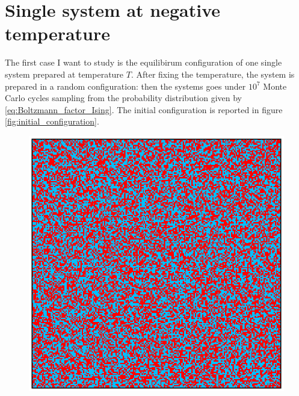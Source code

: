 \section{Single system at negative temperature}
The first case I want to study is the equilibirum configuration of one single system prepared at temperature $T$. After fixing the temperature, the system is prepared in a random configuration: then the systems goes under $10^7$ Monte Carlo cycles 
sampling from the probability distribution given by \ref{eq:Boltzmann_factor_Ising}. The initial configuration is reported in figure \ref{fig:initial_configuration}. \\
\begin{figure}
    \centering 
    \begin{minipage}[c]{0.45\textwidth}
        \centering
        \includegraphics[scale=0.38]{./images/ising/initconf.eps}
    \end{minipage}
    \begin{minipage}[c]{0.45\textwidth}
        \centering

\end{minipage}
\end{figure}
